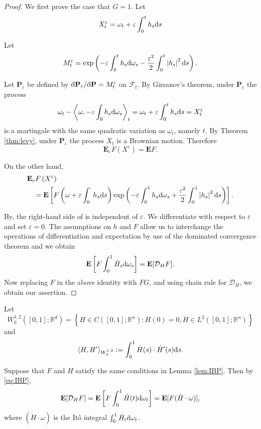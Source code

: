 \documentclass[twoside, 12pt]{book}
\numberwithin{equation}{chapter}
\def\cD{{\mathcal D}}
\def\mR{{\mathbb R}}
\def\bE{{\mathbf E}}
\def\l{\left}
\def\r{\right}
\def\<{\langle}
\def\>{\rangle}
\def\d{\text{\rm{d}}}
\begin{document}
    \begin{proof}
    We first prove the case that $G=1$. Let
    $$
      X_t^{\varepsilon}=\omega_t+\varepsilon \int_0^t h_s \d s
    $$

     Let
    $$
         M_t^{\varepsilon}=\exp \left(-\varepsilon \int_0^t h_s \d \omega_s-\frac{\varepsilon^2}{2} \int_0^t\left|h_s\right|^2 \d s\right) .
    $$

     Let $\mathbf{P}_{\varepsilon}$ be defined by $\d \mathbf{P}_{\varepsilon} / \d \mathbf{P}=M_t^{\varepsilon}$ on $\mathcal{F}_t$. By Girsanov's theorem, under $\mathbf{P}_{\varepsilon}$ the process
    $$
        \omega_t-\left\langle \omega,-\varepsilon \int_0 h_s \d \omega_s\right\rangle_t=\omega_t+\varepsilon \int_0^t h_s \d s=X_t^{\varepsilon}
    $$
    is a martingale with the same quadratic variation as $\omega_t$, namely $t$. By Theorem \ref{thm:levy}, under $\mathbf{P}_{\varepsilon}$ the process $X_t$ is a Brownian motion. Therefore
    $$
        \mathbf{E}_{\varepsilon} F\left(X^{\varepsilon}\right)=\mathbf{E} F.
    $$

    On the other hand,
    $$
    \begin{aligned}
    & \mathbf{E}_{\varepsilon} F\left(X^{\varepsilon}\right) \\
    & \quad=\mathbf{E}\left[F\left(\omega+\varepsilon \int_0^\cdot h_s \d s\right) \exp \left(-\varepsilon \int_0^1 h_s \d \omega_s+\frac{\varepsilon^2}{2} \int_0^1\left|h_s\right|^2 \d s\right)\right] .
    \end{aligned}
    $$

    By, the right-hand side of  is independent of $\varepsilon$. We differentiate with respect to $\varepsilon$ and set $\varepsilon=0$. The assumptions on $h$ and $F$ allow us to interchange the operations of differentiation and expectation by use of the dominated convergence theorem and we obtain
    \[
        \mathbf{E}\left[F \int_0^1 \dot H_s \d \omega_s\right]=\mathbf{E} [ \cD_H F].
    \]
    Now replacing $F$ in the above identity with $FG$, and using chain rule for $\cD_H$, we obtain our assertion. 
    \end{proof}
   
    Let 
    \[
        W^{1,2}_0([0,1];\mR^d)=\l\{H\in C([0,1];\mR^n): H(0)=0, \dot H\in L^2([0,1];\mR^n)\r\}
    \]
    and 
    \[
    \<H, H'\>_{W^{1,2}_0}:= \int_0^1 \dot H(s)\cdot \dot H'(s) \d s. 
    \]
    
    Suppose that $F$ and $H$ satisfy the same conditions in Lemma \ref{lem:IBP}. Then by \eqref{eq:IBP}, 
    \begin{equation}\label{eq:IBP3}
    	\bE [\cD_H F]= \mathbf{E}\left[F  \int_0^1 \dot H(t) \d\omega_t\right]=\bE [F (\dot H\cdot \omega)], 
    \end{equation}
    where $(\dot H\cdot \omega)$ is the It\^o integral $\int_0^1 \dot H_t\d \omega_t$. 
    
\end{document}
